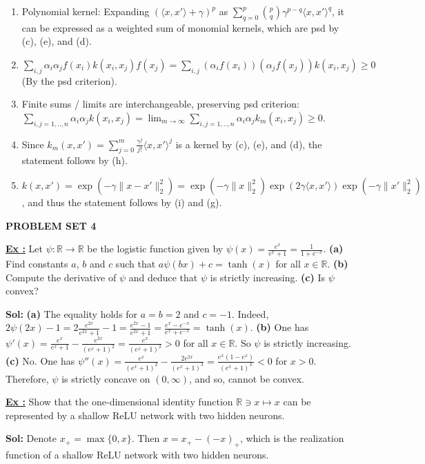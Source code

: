 \documentclass[a4paper,10pt]{article}
\newcommand{\subtitle}[1]{\vspace{0.25cm}\begin{normalsize}\textbf{\textcolor{gray!150}{\uppercase{#1}}}\end{normalsize}}
\newcounter{exerciseCounter}
\newcommand{\exercise}[1]{%
    \vspace{1mm}
    \stepcounter{exerciseCounter}%
    \color{exerciseBlack}
    \textbf{\underline{Ex \theexerciseCounter:}} #1
}
\newcommand{\solution}[1]{%
    {\color{solutionGray} \textbf{Sol: } #1} %
}
\begin{document}
\begin{scriptsize}
{\begin{enumerate}[label=(\alph*)]
  \item Polynomial kernel: Expanding \((\langle x, x' \rangle + \gamma)^p\) as \(\sum_{q=0}^p \binom{p}{q} \gamma^{p-q} \langle x, x' \rangle^q\), it can be expressed as a weighted sum of monomial kernels, which are psd by (c), (e), and (d).
  \item \(\sum_{i,j} \alpha_i \alpha_j f(x_i)k(x_i, x_j)f(x_j) = \sum_{i,j} (\alpha_i f(x_i))(\alpha_j f(x_j))k(x_i, x_j) \geq 0\) (By the psd criterion).
  \item Finite sums / limits are interchangeable, preserving psd criterion: \\ \(\sum_{i,j=1,..,n} \alpha_i \alpha_j k(x_i, x_j) = \lim_{m \to \infty} \sum_{i,j=1,..,n} \alpha_i \alpha_j k_m(x_i, x_j) \geq 0\).
  \item Since \(k_m(x, x') = \sum_{j=0}^m \frac{\gamma^j}{j!} \langle x, x' \rangle^j\) is a kernel by (c), (e), and (d), the statement follows by (h).
  \item \(k(x, x') = \exp(-\gamma \|x - x'\|_2^2) = \exp(-\gamma \|x\|_2^2) \exp(2\gamma \langle x, x' \rangle) \exp(-\gamma \|x'\|_2^2)\), and thus the statement follows by (i) and (g).
\end{enumerate}}


\subtitle{Problem Set 4}

\exercise{Let $\psi: \mathbb{R} \to \mathbb{R}$ be the logistic function given by
$\psi(x) = \frac{e^x}{e^x + 1} = \frac{1}{1 + e^{-x}}$.
\textbf{(a)} Find constants $a$, $b$ and $c$ such that $a\psi(bx) + c = \tanh(x)$ for all $x \in \mathbb{R}$.
\textbf{(b)} Compute the derivative of $\psi$ and deduce that $\psi$ is strictly increasing.
\textbf{(c)} Is $\psi$ convex?}
\solution{
\textbf{(a)} The equality holds for $a = b = 2$ and $c = -1$. Indeed,
$2\psi(2x) - 1 = 2\frac{e^{2x}}{e^{2x} + 1} - 1 = \frac{e^{2x} - 1}{e^{2x} + 1} = \frac{e^x - e^{-x}}{e^x + e^{-x}} = \tanh(x)$.
\textbf{(b)} One has
$\psi'(x) = \frac{e^x}{e^x + 1} - \frac{e^{2x}}{(e^x + 1)^2} = \frac{e^x}{(e^x + 1)^2} > 0$ for all $x \in \mathbb{R}$.
So $\psi$ is strictly increasing.
\textbf{(c)} No. One has
$\psi''(x) = \frac{e^x}{(e^x + 1)^2} - \frac{2e^{2x}}{(e^x + 1)^3} = \frac{e^x(1-e^x)}{(e^x + 1)^3} < 0$ for $x > 0$.
Therefore, $\psi$ is strictly concave on $(0,\infty)$, and so, cannot be convex.}

\exercise{Show that the one-dimensional identity function $\mathbb{R} \ni x \mapsto x$ can be represented by a shallow ReLU network with two hidden neurons.}
\solution{Denote $x_+ = \max\{0,x\}$. Then $x = x_+ - (-x)_+$, which is the realization function of a shallow ReLU network with two hidden neurons.}


\end{scriptsize}
\end{document}
